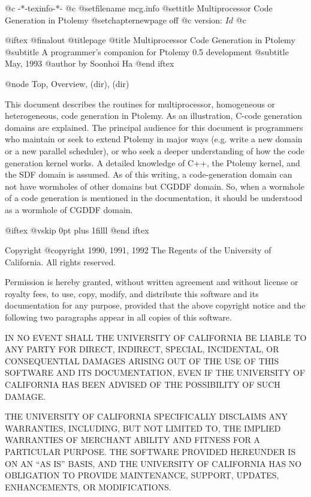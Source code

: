       @c -*-texinfo-*-
@c %
@setfilename mcg.info
@settitle Multiprocessor Code Generation in Ptolemy
@setchapternewpage off
@c version: $Id$
@c %

@iftex
@finalout
@titlepage
@title Multiprocessor Code Generation in Ptolemy
@subtitle A programmer's companion for Ptolemy 0.5 development
@subtitle May, 1993
@author by Soonhoi Ha
@end iftex

@node Top, Overview, (dir), (dir)

This document describes the routines for multiprocessor, homogeneous or
heterogeneous, code generation in Ptolemy. As an illustration, C-code
generation domains are explained. The principal audience for
this document is programmers who maintain or 
seek to extend Ptolemy in major ways
(e.g. write a new domain or a new parallel scheduler), or who seek a
deeper understanding of how the code generation kernel works.  
A detailed knowledge of C++, the Ptolemy kernel, and the SDF domain
is assumed. As of this writing, a code-generation domain can not
have wormholes of other domains but CGDDF domain. So, when a wormhole
of a code generation is mentioned in the documentation, it should be
understood as a wormhole of CGDDF domain.

@iftex
@vskip 0pt plus 1filll
@end iftex

Copyright @copyright{} 1990, 1991, 1992 The Regents of the University of
California.  All rights reserved.

Permission is hereby granted, without written agreement and without
license or royalty fees, to use, copy, modify, and distribute this
software and its documentation for any purpose, provided that the above
copyright notice and the following two paragraphs appear in all copies of
this software.

IN NO EVENT SHALL THE UNIVERSITY OF CALIFORNIA BE LIABLE TO ANY PARTY FOR
DIRECT, INDIRECT, SPECIAL, INCIDENTAL, OR CONSEQUENTIAL DAMAGES ARISING
OUT OF THE USE OF THIS SOFTWARE AND ITS DOCUMENTATION, EVEN IF THE
UNIVERSITY OF CALIFORNIA HAS BEEN ADVISED OF THE POSSIBILITY OF SUCH
DAMAGE.

THE UNIVERSITY OF CALIFORNIA SPECIFICALLY DISCLAIMS ANY WARRANTIES,
INCLUDING, BUT NOT LIMITED TO, THE IMPLIED WARRANTIES OF MERCHANT ABILITY
AND FITNESS FOR A PARTICULAR PURPOSE. THE SOFTWARE PROVIDED HEREUNDER IS
ON AN ``AS IS'' BASIS, AND THE UNIVERSITY OF CALIFORNIA HAS NO OBLIGATION
TO PROVIDE MAINTENANCE, SUPPORT, UPDATES, ENHANCEMENTS, OR MODIFICATIONS.

